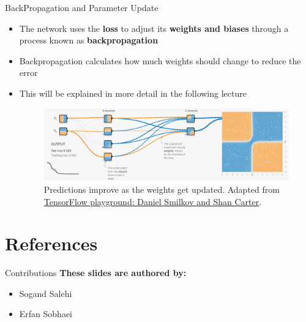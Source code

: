 \documentclass[serif, aspectratio=169]{beamer}
\begin{document}
\begin{frame}[t]{BackPropagation and Parameter Update}
    \begin{itemize}
        \item The network uses the \textbf{loss} to adjust its \textbf{weights and biases} through a process known as \textbf{backpropagation}
        \item Backpropagation calculates how much weights should change to reduce the error
        \item This will be explained in more detail in the following lecture
        \begin{figure}[bh]
            \centering
            \includegraphics[width=\linewidth]{pic/4/tensorflow3.png} \\
            {\scriptsize Predictions improve as the weights get updated. Adapted from \href{playground.tensorflow.org}{TensorFlow playground: Daniel Smilkov and Shan Carter}.}
        \end{figure}
    \end{itemize}
\end{frame}


\section{References}

\begin{frame}{Contributions}
\textbf{These slides are authored by:}
    \begin{itemize}
        \item Sogand Salehi
        \item Erfan Sobhaei
    \end{itemize}
    
\end{frame}


\begin{frame}[allowframebreaks]
   \nocite{*} %
\end{frame}
\end{document}
